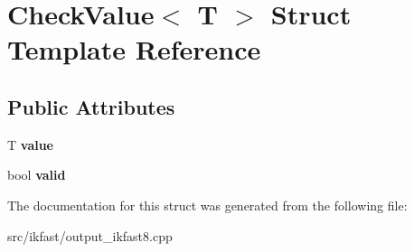 \hypertarget{structCheckValue}{\section{Check\-Value$<$ T $>$ Struct Template Reference}
\label{structCheckValue}
}
\subsection*{Public Attributes}
\begin{DoxyCompactItemize}
\item 
\hypertarget{structCheckValue_a96d0c95abbb5c848c92f09df55d253a1}{T {\bfseries value}}\label{structCheckValue_a96d0c95abbb5c848c92f09df55d253a1}

\item 
\hypertarget{structCheckValue_a3be5a3feb4357bf37b01eef7fd5cc767}{bool {\bfseries valid}}\label{structCheckValue_a3be5a3feb4357bf37b01eef7fd5cc767}

\end{DoxyCompactItemize}


The documentation for this struct was generated from the following file\-:\begin{DoxyCompactItemize}
\item 
src/ikfast/output\-\_\-ikfast8.\-cpp\end{DoxyCompactItemize}
